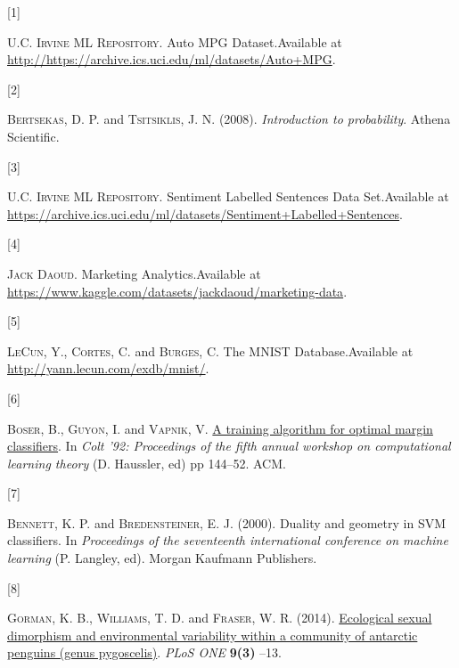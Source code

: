 \documentclass[
  11pt,
  letterpaper,
]{scrbook}
\newlength{\cslhangindent}
\newlength{\csllabelwidth}
\newlength{\cslentryspacingunit} %
\newenvironment{CSLReferences}[2] %
 {%
  \setlength{\parindent}{0pt}
  \ifodd #1
  \let\oldpar\par
  \def\par{\hangindent=\cslhangindent\oldpar}
  \fi
  \setlength{\parskip}{#2\cslentryspacingunit}
 }%
 {}
\newcommand{\CSLLeftMargin}[1]{\parbox[t]{\csllabelwidth}{#1}}
\newcommand{\CSLRightInline}[1]{\parbox[t]{\linewidth - \csllabelwidth}{#1}\break}
\theoremstyle{plain}
\theoremstyle{remark}
\begin{document}

\hypertarget{refs}{}
\begin{CSLReferences}{0}{0}
\leavevmode{}%
\CSLLeftMargin{{[}1{]} }%
\CSLRightInline{\textsc{U.C. Irvine ML Repository}. {Auto MPG
Dataset}.Available at
\url{http://https://archive.ics.uci.edu/ml/datasets/Auto+MPG}.}

\leavevmode{}%
\CSLLeftMargin{{[}2{]} }%
\CSLRightInline{\textsc{Bertsekas}, D. P. and \textsc{Tsitsiklis}, J. N.
(2008). \emph{Introduction to probability}. Athena Scientific.}

\leavevmode{}%
\CSLLeftMargin{{[}3{]} }%
\CSLRightInline{\textsc{U.C. Irvine ML Repository}. {Sentiment Labelled
Sentences Data Set}.Available at
\url{https://archive.ics.uci.edu/ml/datasets/Sentiment+Labelled+Sentences}.}

\leavevmode{}%
\CSLLeftMargin{{[}4{]} }%
\CSLRightInline{\textsc{Jack Daoud}. {Marketing Analytics}.Available at
\url{https://www.kaggle.com/datasets/jackdaoud/marketing-data}.}

\leavevmode{}%
\CSLLeftMargin{{[}5{]} }%
\CSLRightInline{\textsc{LeCun}, Y., \textsc{Cortes}, C. and
\textsc{Burges}, C. {The MNIST Database}.Available at
\url{http://yann.lecun.com/exdb/mnist/}.}

\leavevmode{}%
\CSLLeftMargin{{[}6{]} }%
\CSLRightInline{\textsc{Boser}, B., \textsc{Guyon}, I. and
\textsc{Vapnik}, V.
\href{https://dl.acm.org/doi/pdf/10.1145/130385.130401}{{A training
algorithm for optimal margin classifiers}}. In \emph{Colt '92:
Proceedings of the fifth annual workshop on computational learning
theory} (D. Haussler, ed) pp 144--52. ACM.}

\leavevmode{}%
\CSLLeftMargin{{[}7{]} }%
\CSLRightInline{\textsc{Bennett}, K. P. and \textsc{Bredensteiner}, E.
J. (2000). Duality and geometry in SVM classifiers. In \emph{Proceedings
of the seventeenth international conference on machine learning} (P.
Langley, ed). Morgan Kaufmann Publishers.}

\leavevmode{}%
\CSLLeftMargin{{[}8{]} }%
\CSLRightInline{\textsc{Gorman}, K. B., \textsc{Williams}, T. D. and
\textsc{Fraser}, W. R. (2014).
\href{https://doi.org/10.1371/journal.pone.0090081}{Ecological sexual
dimorphism and environmental variability within a community of antarctic
penguins (genus pygoscelis)}. \emph{PLoS ONE} \textbf{9(3)} --13.}


\end{CSLReferences}
\end{document}
